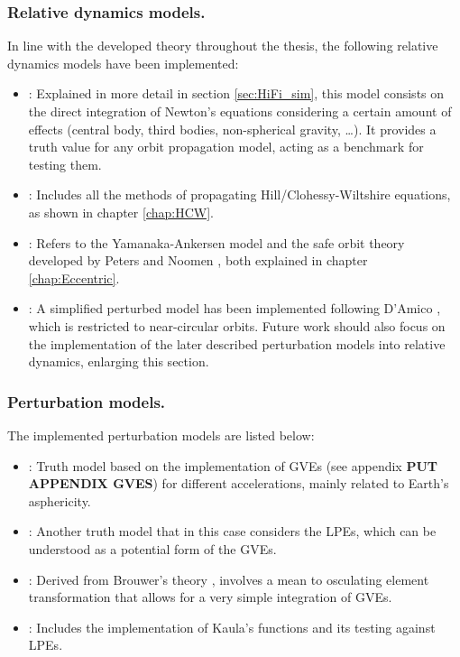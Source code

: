 		\subsubsection{Relative dynamics models.}
		\indent In line with the developed theory throughout the thesis, the following relative dynamics models have been implemented:
		\begin{itemize}
		\item[\GMVred{I.}] : Explained in more detail in section \ref{sec:HiFi_sim}, this model consists on the direct integration of Newton's equations considering a certain amount of effects (central body, third bodies, non-spherical gravity, \ldots). It provides a truth value for any orbit propagation model, acting as a benchmark for testing them.
		\item[\GMVred{II.}] : Includes all the methods of propagating Hill/Clohessy-Wiltshire equations, as shown in chapter \ref{chap:HCW}.
		\item[\GMVred{III.}] : Refers to the Yamanaka-Ankersen \cite{Yamanaka_Ankersen} model and the safe orbit theory developed by Peters and Noomen \cite{Peters_Noomen}, both explained in chapter \ref{chap:Eccentric}.
		\item[\GMVred{IV.}] : A simplified perturbed model has been implemented following D'Amico \cite{dAmicoDLR}, which is restricted to near-circular orbits. Future work should also focus on the implementation of the later described perturbation models into relative dynamics, enlarging this section.
		\end{itemize}
		\subsubsection{Perturbation models.}
		\indent The implemented perturbation models are listed below:
		\begin{itemize}
		\item[\GMVred{I.}] : Truth model based on the implementation of GVEs (see appendix \textbf{PUT APPENDIX GVES}) for different accelerations, mainly related to Earth's asphericity.
		\item[\GMVred{II.}] : Another truth model that in this case considers the LPEs, which can be understood as a potential form of the GVEs. 
		\item[\GMVred{III.}] \cite{GA_STM}: Derived from Brouwer's theory \cite{Brouwer}, involves a mean to osculating element transformation that allows for a very simple integration of GVEs.
		\item[\GMVred{IV.}] \cite{Kaula}: Includes the implementation of Kaula's functions and its testing against LPEs.
		\end{itemize}
